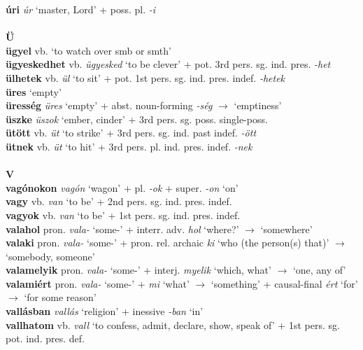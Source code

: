 \documentclass[11pt]{article}
\begin{document}
\textbf{úri} \emph{úr} `master, Lord' + poss. pl. \emph{-i} \\
\ \\
\noindent \textbf{\large Ü} \\
\textbf{ügyel} vb. `to watch over smb or smth' \\
\textbf{ügyeskedhet} vb. \emph{ügyesked} `to be clever' +
  pot. 3rd pers. sg. ind. pres. \emph{-het} \\
\textbf{ülhetek} vb. \emph{ül}
`to sit' + pot. 1st pers. sg. ind. pres. indef. \emph{-hetek} \\
\textbf{üres} `empty' \\
\textbf{üresség} \emph{üres} `empty' +
abst. noun\hyp{}forming \emph{-ség} $\rightarrow$ `emptiness' \\
\textbf{üszke} \emph{üszok} `ember, cinder' + 3rd
pers. sg. poss. single\hyp{}poss. \\
\textbf{ütött} vb. \emph{üt} `to strike' + 3rd pers. sg. ind. past
indef. \emph{-ött} \\
\textbf{ütnek} vb. \emph{üt} `to hit' + 3rd
pers. pl. ind. pres. indef. \emph{-nek} \\
\ \\
\noindent \textbf{\large V} \\
\textbf{vagónokon} \emph{vagón} `wagon' + pl. \emph{-ok} +
super. \emph{-on} `on' \\
\textbf{vagy} vb. \emph{van} `to be' + 2nd
pers. sg. ind. pres. indef. \\
\textbf{vagyok} vb. \emph{van} `to be' + 1st
pers. sg. ind. pres. indef. \\
\textbf{valahol} pron. \emph{vala-} `some-' + interr. adv. \emph{hol} `where?' $\rightarrow$ `somewhere' \\
\textbf{valaki} pron. \emph{vala-} `some-' +
pron. rel. archaic \emph{ki} `who (the person(s) that)' $\rightarrow$
`somebody, someone' \\
\textbf{valamelyik} pron. \emph{vala-} `some-' +
    interj. \emph{myelik} `which, what' $\rightarrow$ `one, any of' \\
\textbf{valamiért} pron. \emph{vala-} `some-' + \emph{mi} `what' $\rightarrow$ `something' +
causal\hyp{}final \emph{ért} `for' $\rightarrow$ `for some reason' \\
\textbf{vallásban} \emph{vallás} `religion' + inessive \emph{-ban}
`in' \\
\textbf{vallhatom} vb. \emph{vall} `to confess, admit, declare, show,
speak of' + 1st pers. sg. pot. ind. pres. def. \\
\end{document}
